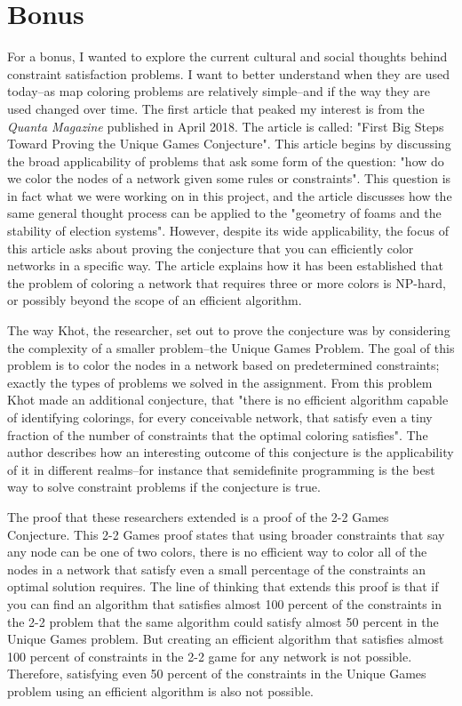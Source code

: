 \documentclass{article}
\begin{document}
\section{Bonus}
For a bonus, I wanted to explore the current cultural and social thoughts behind constraint satisfaction problems. I want to better understand when they are used today--as map coloring problems are relatively simple--and if the way they are used changed over time. The first article that peaked my interest is from the \textit{Quanta Magazine} published in April 2018. The article is called: "First Big Steps Toward Proving the Unique Games Conjecture". This article begins by discussing the broad applicability of problems that ask some form of the question: "how do we color the nodes of a network given some rules or constraints". This question is in fact what we were working on in this project, and the article discusses how the same general thought process can be applied to the "geometry of foams and the stability of election systems". However, despite its wide applicability, the focus of this article asks about proving the conjecture that you can efficiently color networks in a specific way. The article explains how it has been established that the problem of coloring a network that requires three or more colors is NP-hard, or possibly beyond the scope of an efficient algorithm. 

The way Khot, the researcher, set out to prove the conjecture was by considering the complexity of a smaller problem--the Unique Games Problem. The goal of this problem is to color the nodes in a network based on predetermined constraints; exactly the types of problems we solved in the assignment. From this problem Khot made an additional conjecture, that "there is no efficient algorithm capable of identifying colorings, for every conceivable network, that satisfy even a tiny fraction of the number of constraints that the optimal coloring satisfies". The author describes how an interesting outcome of this conjecture is the applicability of it in different realms--for instance that semidefinite programming is the best way to solve constraint problems if the conjecture is true. 

The proof that these researchers extended is a proof of the 2-2 Games Conjecture. This 2-2 Games proof states that using broader constraints that say any node can be one of two colors, there is no efficient way to color all of the nodes in a network that satisfy even a small percentage of the constraints an optimal solution requires. The line of thinking that extends this proof is that if you can find an algorithm that satisfies almost 100 percent of the constraints in the 2-2 problem that the same algorithm could satisfy almost 50 percent in the Unique Games problem. But creating an efficient algorithm that satisfies almost 100 percent of constraints in the 2-2 game for any network is not possible. Therefore, satisfying even 50 percent of the constraints in the Unique Games problem using an efficient algorithm is also not possible.
\end{document}
